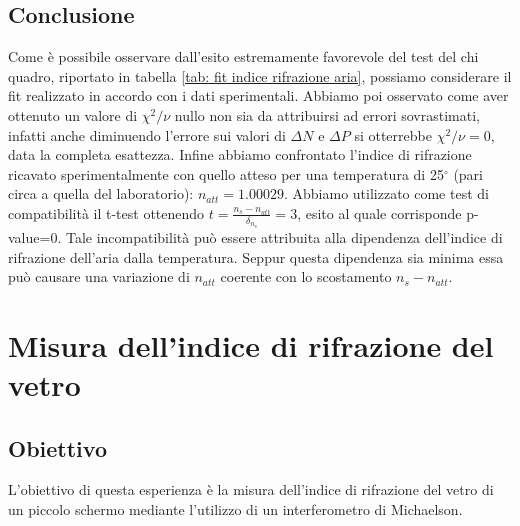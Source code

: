 \documentclass[a4paper]{article}
\begin{document}
\subsection{Conclusione}
Come è possibile osservare dall'esito estremamente favorevole del test del chi quadro, riportato in tabella \ref{tab: fit indice rifrazione aria}, possiamo considerare il fit realizzato in accordo con i dati sperimentali. Abbiamo poi osservato come aver ottenuto un valore di $\chi^2/\nu$ nullo non sia da attribuirsi ad errori sovrastimati, infatti anche diminuendo l'errore sui valori di $\Delta N$ e $\Delta P$ si otterrebbe $\chi^2/\nu= 0$, data la completa esattezza. Infine abbiamo confrontato l'indice di rifrazione ricavato sperimentalmente con quello atteso per una temperatura di 25$^\circ$ (pari circa a quella del laboratorio): $n_{att} =1.00029$. Abbiamo utilizzato come test di compatibilità il t-test ottenendo $t= \frac{n_s-n_{att}}{\delta_{n_s}}=3$, esito al quale corrisponde p-value=0. Tale incompatibilità può essere attribuita alla dipendenza dell'indice di rifrazione dell'aria dalla temperatura. Seppur questa dipendenza sia minima essa può causare una variazione di $n_{att}$ coerente con lo scostamento $n_s-n_{att}$.

\section{Misura dell'indice di rifrazione del vetro}
\subsection{Obiettivo}
L'obiettivo di questa esperienza è la misura dell'indice di rifrazione del vetro di un  piccolo schermo mediante l'utilizzo di un interferometro di Michaelson.
\end{document}
